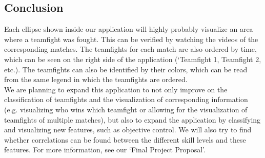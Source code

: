 \documentclass[11pt,twoside,a4paper]{article}
\begin{document}
\subsection*{Conclusion}
Each ellipse shown inside our application will highly probably visualize an area where a teamfight was fought. This can be verified by watching the videos of the corresponding matches. The teamfights for each match are also ordered by time, which can be seen on the right side of the application (`Teamfight 1, Teamfight 2, etc.). The teamfights can also be identified by their colors, which can be read from the same legend in which the teamfights are ordered.\\
We are planning to expand this application to not only improve on the classification of teamfights and the visualization of corresponding information (e.g. visualizing who wins which teamfight or allowing for the visualization of teamfights of multiple matches), but also to expand the application by classifying and visualizing new features, such as objective control. We will also try to find whether correlations can be found between the different skill levels and these features. For more information, see our `Final Project Proposal'.
\end{document}
